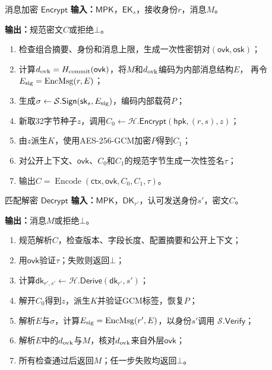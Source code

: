 \begin{ibmealgorithm}{消息加密 $\mathsf{Encrypt}$}
\label{alg:encrypt}
\textbf{输入：}$\mathsf{MPK}$，$\mathsf{EK}_s$，接收身份$r$，消息$M$。\par
\textbf{输出：}规范密文$C$或拒绝$\bot$。
\begin{enumerate}
  \item 检查组合摘要、身份和消息上限，生成一次性密钥对$(\mathsf{ovk},\mathsf{osk})$；
  \item 计算$d_{\rm ovk}=H_{\rm commit}(\mathsf{ovk})$，将$M$和$d_{\rm ovk}$编码为内部消息结构$E$，
        再令$E_{\rm sig}=\operatorname{EncMsg}(r,E)$；
  \item 生成$\sigma\leftarrow\mathcal S.\mathsf{Sign}(\mathsf{sk}_s,E_{\rm sig})$，编码内部载荷$P$；
  \item 新取32字节种子$z$，调用$C_0\leftarrow\mathcal H.\mathsf{Encrypt}
        (\mathsf{hpk},(r,s),z)$；
  \item 由$z$派生$K$，使用AES-256-GCM加密$P$得到$C_1$；
  \item 对公开上下文、$\mathsf{ovk}$、$C_0$和$C_1$的规范字节生成一次性签名$\tau$；
  \item 输出$C=\operatorname{Encode}(\mathsf{ctx},\mathsf{ovk},C_0,C_1,\tau)$。
\end{enumerate}
\end{ibmealgorithm}

\begin{ibmealgorithm}{匹配解密 $\mathsf{Decrypt}$}
\label{alg:decrypt}
\textbf{输入：}$\mathsf{MPK}$，$\mathsf{DK}_{r'}$，认可发送身份$s'$，密文$C$。\par
\textbf{输出：}消息$M$或拒绝$\bot$。
\begin{enumerate}
  \item 规范解析$C$，检查版本、字段长度、配置摘要和公开上下文；
  \item 用$\mathsf{ovk}$验证$\tau$；失败则返回$\bot$；
  \item 计算$\mathsf{dk}_{r',s'}\leftarrow\mathcal H.\mathsf{Derive}(\mathsf{dk}_{r'},s')$；
  \item 解开$C_0$得到$z$，派生$K$并验证GCM标签，恢复$P$；
  \item 解析$E$与$\sigma$，计算$E_{\rm sig}=\operatorname{EncMsg}(r',E)$，以身份$s'$调用
        $\mathcal S.\mathsf{Verify}$；
  \item 解析$E$中的$d_{\rm ovk}$与$M$，核对$d_{\rm ovk}$来自外层$\mathsf{ovk}$；
  \item 所有检查通过后返回$M$；任一步失败均返回$\bot$。
\end{enumerate}
\end{ibmealgorithm}

